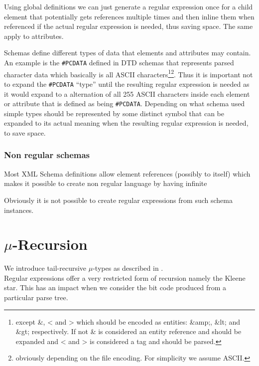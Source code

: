 \documentclass[a4paper, oneside]{memoir}
\theoremstyle{definition}
\begin{document}
Using global definitions we can just generate a regular expression once for a
child element that potentially gets references multiple times and then inline
them when referenced if the actual regular expression is needed, thus saving
space. The same apply to attributes.
\label{sec:global-definitions-save-space}

Schemas define different types of data that elements and attributes may
contain. An example is the \texttt{\#PCDATA} defined in DTD schemas that
represents parsed character data which basically is all ASCII
characters\footnote{except \&, < and > which should be encoded as entities:
  \&amp;, \&lt; and \&gt; respectively. If not \& is considered an entity
  reference and should be expanded and < and > is considered a tag and should be
  parsed.}\footnote{obviously depending on the file encoding. For simplicity we
  assume ASCII.}. Thus it is important not to expand the \texttt{\#PCDATA}
``type'' until the resulting regular expression is needed as it would expand to
a alternation of all 255 ASCII characters inside each element or attribute that
is defined as being \texttt{\#PCDATA}. Depending on what schema used simple
types should be represented by some distinct symbol that can be expanded to its
actual meaning when the resulting regular expression is needed, to save space.

\subsection{ Non regular schemas}

Most XML Schema definitions allow element references (possibly to itself) which
makes it possible to create non regular language by having
infinite

Obviously it is not possible to create regular expressions from such schema
instances.

\chapter{$\mu$-Recursion}
\label{chap:mu-recursion}

We introduce tail-recursive $\mu$-types as described in \cite{heni2010}.\\[1em]

Regular expressions offer a very restricted form of recursion namely the Kleene
star. This has an impact when we consider the bit code produced from a
particular parse tree.
\end{document}
